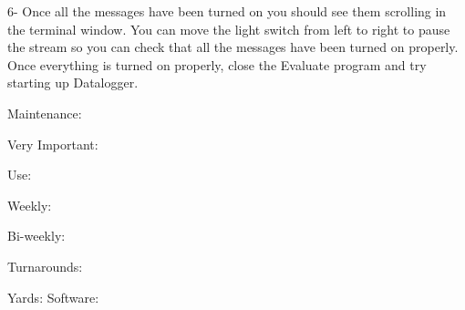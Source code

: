\documentclass[]{book}
\theoremstyle{definition}
\theoremstyle{definition}
\theoremstyle{definition}
\theoremstyle{remark}
\begin{document}
6- Once all the messages have been turned on you should see them
scrolling in the terminal window. You can move the light switch from
left to right to pause the stream so you can check that all the messages
have been turned on properly. Once everything is turned on properly,
close the Evaluate program and try starting up Datalogger.

Maintenance:

Very Important:

Use:

Weekly:

Bi-weekly:

Turnarounds:

Yards: Software:


\end{document}
